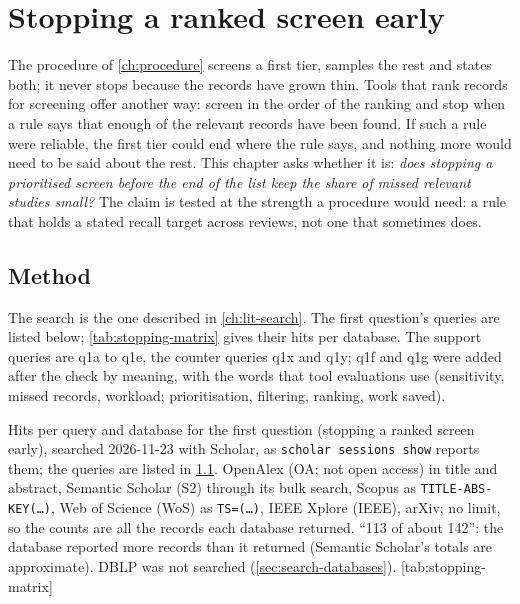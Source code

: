 \chapter{Stopping a ranked screen early}
\label{ch:stopping}


The procedure of \cref{ch:procedure} screens a first tier, samples the
rest and states both; it never stops because the records have grown
thin.
Tools that rank records for screening offer another way: screen in the
order of the ranking and stop when a rule says that enough of the
relevant records have been found.
If such a rule were reliable, the first tier could end where the rule
says, and nothing more would need to be said about the rest.
This chapter asks whether it is: \emph{does stopping a prioritised
screen before the end of the list keep the share of missed relevant
studies small?}
The claim is tested at the strength a procedure would need: a rule that
holds a stated recall target across reviews, not one that sometimes
does.

\section{Method}
\label{sec:stopping-method}

The search is the one described in \cref{ch:lit-search}.
The first question's queries are listed below; \cref{tab:stopping-matrix}
gives their hits per database.
The support queries are q1a to q1e, the counter queries q1x and q1y; q1f
and q1g were added after the check by meaning, with the words that tool
evaluations use (sensitivity, missed records, workload; prioritisation,
filtering, ranking, work saved).


\begin{table}
  \begin{sidecaption}{%
      Hits per query and database for the first question (stopping a
      ranked screen early), searched 2026-11-23 with Scholar, as
      \texttt{scholar sessions show} reports them; the queries are
      listed in \cref{sec:stopping-method}.
      OpenAlex (OA; not open access) in title and abstract, Semantic
      Scholar (S2) through its bulk search, Scopus as
      \texttt{TITLE-ABS-KEY(\dots)}, Web of Science (WoS) as
      \texttt{TS=(\dots)}, IEEE Xplore (IEEE), arXiv; no limit, so the
      counts are all the records each database returned.
      \enquote{113 of about 142}: the database reported more records
      than it returned (Semantic Scholar's totals are approximate).
      DBLP was not searched (\cref{sec:search-databases}).
    }[tab:stopping-matrix]
    \footnotesize
    
  \end{sidecaption}
\end{table}

